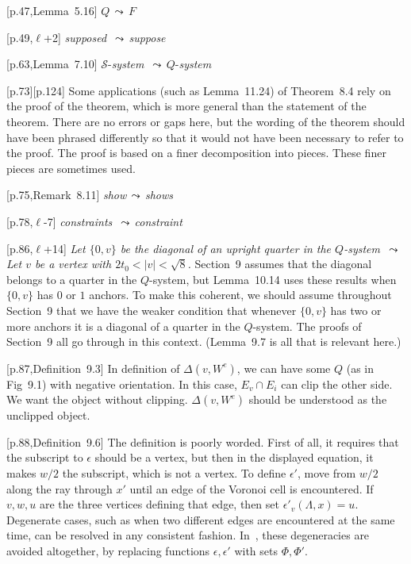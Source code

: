 \documentclass[11pt]{amsart}
\def\lto{\ensuremath{\,\leadsto\,}}
\def\line{$\ell$}
\def\sz{small} %
\def\rmx{\rm}
\begin{document}
\begin{\sz}
\baselineskip

[p.47,Lemma~5.16] $Q\lto F$

[p.49,\line+2] {\it supposed} \lto {\it suppose}
	
[p.63,Lemma~7.10]
	${\mathcal S}$-{\it system} \lto $Q$-{\it system}
	
[p.73][p.124] {\rmx Some applications (such as Lemma~11.24) of Theorem~8.4 rely on
the proof of the theorem, which is more general than
the statement of the theorem.  There are no errors or gaps here,
but the wording of the theorem should have been phrased differently
so that it would not have been necessary to refer to the proof.  The proof is based on a finer
decomposition into pieces.  These finer pieces are sometimes used.}

[p.75,Remark~8.11]
	{\it show}\lto {\it shows}

[p.78,\line-7] {\it constraints} \lto{\it  constraint}

[p.86,\line+14] {\it Let $\{0,v\}$ be 
          the diagonal of an upright quarter in the $Q$-system
        \lto
       Let $v$ be a vertex with $2t_0<|v|<\sqrt8$.}
           {\rmx Section~9 assumes that the diagonal belongs to
          a quarter in the $Q$-system, but Lemma~10.14 uses these
          results when $\{0,v\}$ has $0$ or $1$ anchors.  To make
          this coherent, we should assume throughout Section~9 that
          we have the weaker condition that whenever $\{0,v\}$ has
          two or more anchors it is a diagonal of a quarter in the $Q$-system.
          The proofs of Section~9 all go through in this context.
           (Lemma~9.7 is all that is relevant here.)}

[p.87,Definition~9.3]
	{\rmx In definition of $\Delta(v,W^e)$, we
	can have some $Q$ (as in Fig~9.1)
	with negative orientation.
	In this case, $E_v\cap E_i$ can clip
	the other side.  We want the object
	without clipping.   $\Delta(v,W^e)$ should be understood as the
        unclipped object.}
	
[p.88,Definition~9.6]
	{\rmx The definition is poorly worded.  First of
	all, it requires that the subscript to
	$\epsilon$ should be a vertex, but then in
	the displayed equation, it makes $w/2$ the
	subscript, which is not a vertex.   To
	define $\epsilon'$, move from $w/2$ along
	the ray through $x'$ until an edge of the
	Voronoi cell is encountered.  If $v,w,u$
	are the three vertices defining that edge,
	then set $\epsilon'_v(\Lambda,x)=u$.
	Degenerate cases, such as when two different
	edges are encountered at the same time,
	can be resolved in any consistent fashion.  In~\cite{hales:2008:collection},
      these degeneracies are avoided altogether, by replacing functions 
      $\epsilon,\epsilon'$ with sets $\Phi,\Phi'$.
     }
	

\end{\sz}
\end{document}
